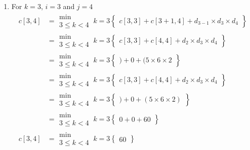 \documentclass[12pt]{report}
\begin{document}
\begin{enumerate}
\begin{align*}
\begin{aligned}
			0 + 0 + 120
		\end{aligned}\right\}\\
		&=\substack{\text{min}\\2\le k\le 3}~k=2
		\left\{
		\begin{aligned}
			120
		\end{aligned}\right\}\\
	\end{align*}
	\item[iii] For $k=3$, $i = 3$ and $j=4$
	\begin{align*}
		c[3,4] &=\substack{\text{min}\\3\le k < 4}~k=3
		\left\{
		\begin{aligned}
			c[3,3] + c[3+1,4] + d_{3-1} \times d_3\times d_4
		\end{aligned}\right\}\\
		&=\substack{\text{min}\\3\le k < 4}~k=3
		\left\{
		\begin{aligned}
			c[3,3] + c[4,4] + d_{2} \times d_3\times d_4
		\end{aligned}\right\}\\
		&=\substack{\text{min}\\3\le k < 4}~k=3
		\left\{
		\begin{aligned}
			) + 0 + (5 \times 6\times 2
		\end{aligned}\right\}\\
		&=\substack{\text{min}\\3\le k < 4}~k=3
		\left\{
		\begin{aligned}
			c[3,3] + c[4,4] + d_{2} \times d_3\times d_4
		\end{aligned}\right\}\\
		&=\substack{\text{min}\\3\le k < 4}~k=3
		\left\{
		\begin{aligned}
			) + 0 + (5 \times 6\times 2)
		\end{aligned}\right\}\\
		&=\substack{\text{min}\\3\le k < 4}~k=3
		\left\{
		\begin{aligned}
			0 + 0 + 60
		\end{aligned}\right\}\\
		c[3,4]&=\substack{\text{min}\\3\le k < 4}~k=3
		\left\{
		\begin{aligned}
			60
		\end{aligned}\right\}
	\end{align*}

\end{enumerate}
\end{document}
